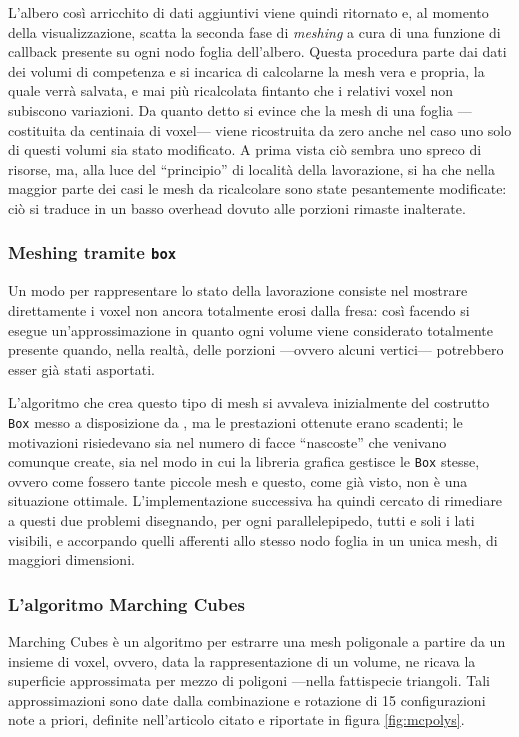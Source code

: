 L'albero così arricchito di dati aggiuntivi viene quindi ritornato e, al momento della visualizzazione, scatta la seconda fase di \emph{meshing} a cura di una funzione di callback presente su ogni nodo foglia dell'albero. Questa procedura parte dai dati dei volumi di competenza e si incarica di calcolarne la mesh vera e propria, la quale verrà salvata, e mai più ricalcolata fintanto che i relativi voxel non subiscono variazioni. Da quanto detto si evince che la mesh di una foglia ---costituita da centinaia di voxel--- viene ricostruita da zero anche nel caso uno solo di questi volumi sia stato modificato. A prima vista ciò sembra uno spreco di risorse, ma, alla luce del ``principio'' di località della lavorazione, si ha che nella maggior parte dei casi le mesh da ricalcolare sono state pesantemente modificate: ciò si traduce in un basso overhead dovuto alle porzioni rimaste inalterate.

\subsubsection{Meshing tramite \texttt{box}}
\label{meshingbox} Un modo per rappresentare lo stato della lavorazione consiste nel mostrare direttamente i voxel non ancora totalmente erosi dalla fresa: così facendo si esegue un'approssimazione in quanto ogni volume viene considerato totalmente presente quando, nella realtà, delle porzioni ---ovvero alcuni vertici--- potrebbero esser già stati asportati.

L'algoritmo che crea questo tipo di mesh si avvaleva inizialmente del costrutto \texttt{Box} messo a disposizione da \osg, ma le prestazioni ottenute erano scadenti; le motivazioni risiedevano sia nel numero di facce ``nascoste'' che venivano comunque create, sia nel modo in cui la libreria grafica gestisce le \texttt{Box} stesse, ovvero come fossero tante piccole mesh e questo, come già visto, non è una situazione ottimale. L'implementazione successiva ha quindi cercato di rimediare a questi due problemi disegnando, per ogni parallelepipedo, tutti e soli i lati visibili, e accorpando quelli afferenti allo stesso nodo foglia in un unica mesh, di maggiori dimensioni.

\subsubsection{L'algoritmo Marching Cubes}
\label{mcalgo} Marching Cubes \cite{Lorensen:1987:MCH:37402.37422} è un algoritmo per estrarre una mesh poligonale a partire da un insieme di voxel, ovvero, data la rappresentazione di un volume, ne ricava la superficie approssimata per mezzo di poligoni ---nella fattispecie triangoli. Tali approssimazioni sono date dalla combinazione e rotazione di 15 configurazioni note a priori, definite nell'articolo citato e riportate in figura \ref{fig:mcpolys}.

